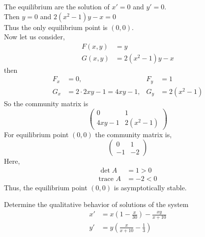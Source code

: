 \documentclass[../main-sheet.tex]{subfiles}
\begin{document}
\begin{soln}
    The equilibrium are the solution of \(x'=0\) and \(y'=0\).\\
    Then \(y=0\) and \(2(x^2-1)y-x=0\)\\
    Thus the only equilibrium point is \((0,0)\).\\
    Now let us consider,
    \begin{align*}
        F(x,y)&=y\\
        G(x,y)&=2(x^2-1)y-x
    \end{align*}
    then \begin{align*}
        F_x&=0, & F_y&=1\\
        G_x&=2\cdot 2xy-1=4xy-1, & G_y&=2(x^2-1)
    \end{align*}
    So the community matrix is
    \[\begin{pmatrix}
        0 &1\\
        4xy-1 &2(x^2-1)
    \end{pmatrix}\]
    For equilibrium point \((0,0)\) the community matrix is,
    \[\begin{pmatrix}
        0 &1\\
        -1 &-2
    \end{pmatrix}\]
Here,
\begin{align*}
    \det A&=1>0\\
    \text{trace }A&=-2<0
\end{align*}
Thus, the equilibrium point \((0,0)\) is asymptotically stable.
\end{soln}
\begin{prob}
    Determine the qualitative behavior of solutions of the system
    \begin{align*}
        x'&=x\left( 1-\frac{x}{30} \right)-\frac{xy}{x+10}\\
        y'&=y\left( \frac{x}{x+10}-\frac{1}{3} \right)
    \end{align*}
\end{prob}
\end{document}
